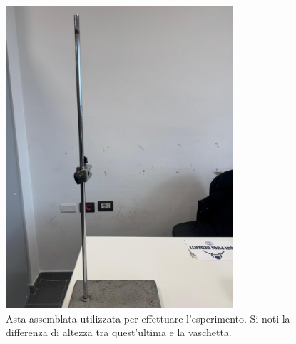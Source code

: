 \begin{figure}[H]
	\centering
	\includegraphics[width=0.75\textwidth]{./figures/asta}
	\caption{Asta assemblata utilizzata per effettuare l'esperimento. Si noti la differenza di altezza tra quest'ultima e la vaschetta.}
\end{figure}